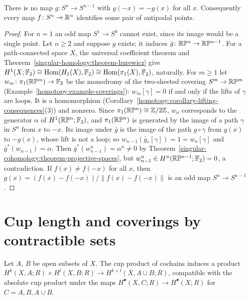 \begin{corollary}\label{singular-cohomology:corollary-borsuk-ulam}
There is no map $g \colon S^n \to S^{n-1}$ with $g(-x) = -g(x)$ for all $x$. Consequently every map $f \colon S^n \to \mathbb{R}^n$ identifies some pair of antipodal points.
\end{corollary}

\begin{proof}
For $n = 1$ an odd map $S^1 \to S^0$ cannot exist, since its image would be a single point. Let $n \geq 2$ and suppose $g$ exists; it induces
$\bar{g} \colon \mathbb{R}\mathbb{P}^n \to \mathbb{R}\mathbb{P}^{n-1}$. For a path-connected space $X$, the universal coefficient theorem and Theorem~\ref{singular-homology:theorem-hurewicz} give
$H^1(X; \mathbb{F}_2) \cong \operatorname{Hom}(H_1(X), \mathbb{F}_2) \cong \operatorname{Hom}(\pi_1(X), \mathbb{F}_2)$, naturally. For $m \geq 1$ let $w_m \colon \pi_1(\mathbb{R}\mathbb{P}^m) \to \mathbb{F}_2$ be the monodromy of
the two-sheeted covering $S^m \to \mathbb{R}\mathbb{P}^m$ (Example~\ref{homotopy:example-coverings}): $w_m[\gamma] = 0$ if and only if the lifts of $\gamma$ are loops. It is a
homomorphism (Corollary~\ref{homotopy:corollary-lifting-consequences}(3)) and nonzero. Since $\pi_1(\mathbb{R}\mathbb{P}^n) \cong \mathbb{Z}/2\mathbb{Z}$, $w_n$ corresponds to the generator $\alpha$ of
$H^1(\mathbb{R}\mathbb{P}^n; \mathbb{F}_2)$, and $\pi_1(\mathbb{R}\mathbb{P}^n)$ is generated by the image of a path $\gamma$ in $S^n$ from $x$ to $-x$. Its image under $\bar{g}$ is the image of the path
$g \circ \gamma$ from $g(x)$ to $-g(x)$, whose lift is not a loop; so $w_{n-1}(\bar{g}_*[\gamma]) = 1 = w_n[\gamma]$ and $\bar{g}^*(w_{n-1}) = \alpha$. Then
$\bar{g}^*(w_{n-1}^n) = \alpha^n \neq 0$ by Theorem~\ref{singular-cohomology:theorem-projective-spaces}, but $w_{n-1}^n \in H^n(\mathbb{R}\mathbb{P}^{n-1}; \mathbb{F}_2) = 0$, a contradiction.
If $f(x) \neq f(-x)$ for all $x$, then $g(x) = (f(x) - f(-x))/\|f(x) - f(-x)\|$ is an odd map $S^n \to S^{n-1}$.
\end{proof}

\section{Cup length and coverings by contractible sets}\label{singular-cohomology:section-cup-length}

\begin{lemma}\label{singular-cohomology:lemma-relative-cup}
Let $A$, $B$ be open subsets of $X$. The cup product of cochains induces a product $H^k(X, A; R) \times H^l(X, B; R) \to H^{k+l}(X, A \cup B; R)$, compatible with the absolute cup product under the maps
$H^\bullet(X, C; R) \to H^\bullet(X; R)$ for $C = A, B, A \cup B$.
\end{lemma}

